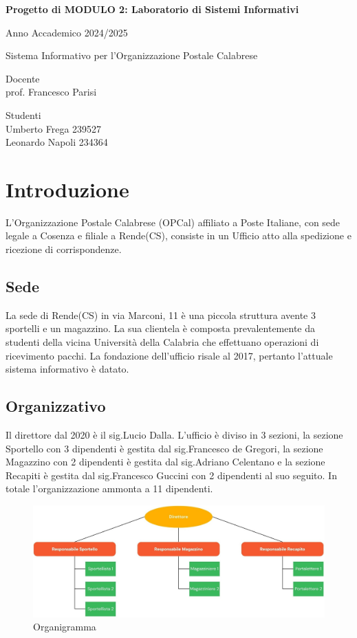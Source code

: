 \documentclass[a4paper,12pt]{article}
\author{Umberto Frega, Leonardo Napoli}
\begin{document}
\pagestyle{fancy}

\begin{titlepage}
  \centering
  {\Large \bfseries Progetto di MODULO 2: Laboratorio di Sistemi Informativi\par}
  {\Large Anno Accademico 2024/2025 \par}
  \vspace{1cm} %
  \vfill
  {\huge Sistema Informativo per l'Organizzazione Postale Calabrese\par}
  \vfill
  \noindent
  \begin{minipage}[t]{0.5\textwidth}
    \raggedright
    Docente \\  prof. Francesco Parisi
  \end{minipage}%
  \hfill
  \begin{minipage}[t]{0.4\textwidth}
    \raggedleft
    Studenti \\ Umberto Frega 239527 \\ Leonardo Napoli 234364
  \end{minipage}

\end{titlepage}
\tableofcontents
\newpage
\section{Introduzione}
L'Organizzazione Postale Calabrese (OPCal) affiliato a Poste Italiane, con sede legale a Cosenza e filiale a Rende(CS), 
consiste in un Ufficio atto alla spedizione e ricezione di corrispondenze.
\subsection{Sede}
La sede di Rende(CS) in via Marconi, 11 è una piccola struttura avente 3 sportelli e un magazzino. La sua clientela è composta 
prevalentemente da studenti della vicina Università della Calabria che effettuano operazioni di ricevimento pacchi.
La fondazione dell'ufficio risale al 2017, pertanto l'attuale sistema informativo è datato.
\subsection{Organizzativo}
Il direttore dal 2020 è il sig.Lucio Dalla. L'ufficio è diviso in 3 sezioni, la sezione Sportello con 3 dipendenti è gestita 
dal sig.Francesco de Gregori, la sezione Magazzino con 2 dipendenti è gestita dal sig.Adriano Celentano e la sezione Recapiti 
è gestita dal sig.Francesco Guccini con 2 dipendenti al suo seguito. In totale l'organizzazione ammonta a 11 dipendenti.
\begin{figure}[h]
  \centering
  \includegraphics[width=0.8\linewidth]{assets/organigramma.jpg}
  \caption{Organigramma}
\end{figure}
\end{document}
